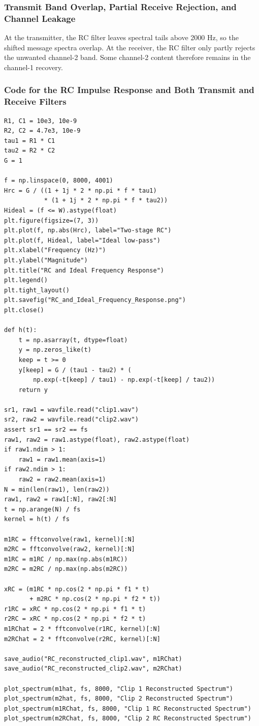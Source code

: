 \documentclass[11pt,a4paper]{article}
\begin{document}
\subsubsection{Transmit Band Overlap, Partial Receive Rejection, and Channel Leakage}

At the transmitter, the RC filter leaves spectral tails above 2000 Hz, so the shifted message spectra overlap. At the receiver, the RC filter only partly rejects the unwanted channel-2 band. Some channel-2 content therefore remains in the channel-1 recovery.

\subsubsection{Code for the RC Impulse Response and Both Transmit and Receive Filters}
\begin{lstlisting}
R1, C1 = 10e3, 10e-9
R2, C2 = 4.7e3, 10e-9
tau1 = R1 * C1
tau2 = R2 * C2
G = 1

f = np.linspace(0, 8000, 4001)
Hrc = G / ((1 + 1j * 2 * np.pi * f * tau1)
           * (1 + 1j * 2 * np.pi * f * tau2))
Hideal = (f <= W).astype(float)
plt.figure(figsize=(7, 3))
plt.plot(f, np.abs(Hrc), label="Two-stage RC")
plt.plot(f, Hideal, label="Ideal low-pass")
plt.xlabel("Frequency (Hz)")
plt.ylabel("Magnitude")
plt.title("RC and Ideal Frequency Response")
plt.legend()
plt.tight_layout()
plt.savefig("RC_and_Ideal_Frequency_Response.png")
plt.close()

def h(t):
    t = np.asarray(t, dtype=float)
    y = np.zeros_like(t)
    keep = t >= 0
    y[keep] = G / (tau1 - tau2) * (
        np.exp(-t[keep] / tau1) - np.exp(-t[keep] / tau2))
    return y

sr1, raw1 = wavfile.read("clip1.wav")
sr2, raw2 = wavfile.read("clip2.wav")
assert sr1 == sr2 == fs
raw1, raw2 = raw1.astype(float), raw2.astype(float)
if raw1.ndim > 1:
    raw1 = raw1.mean(axis=1)
if raw2.ndim > 1:
    raw2 = raw2.mean(axis=1)
N = min(len(raw1), len(raw2))
raw1, raw2 = raw1[:N], raw2[:N]
t = np.arange(N) / fs
kernel = h(t) / fs

m1RC = fftconvolve(raw1, kernel)[:N]
m2RC = fftconvolve(raw2, kernel)[:N]
m1RC = m1RC / np.max(np.abs(m1RC))
m2RC = m2RC / np.max(np.abs(m2RC))

xRC = (m1RC * np.cos(2 * np.pi * f1 * t)
       + m2RC * np.cos(2 * np.pi * f2 * t))
r1RC = xRC * np.cos(2 * np.pi * f1 * t)
r2RC = xRC * np.cos(2 * np.pi * f2 * t)
m1RChat = 2 * fftconvolve(r1RC, kernel)[:N]
m2RChat = 2 * fftconvolve(r2RC, kernel)[:N]

save_audio("RC_reconstructed_clip1.wav", m1RChat)
save_audio("RC_reconstructed_clip2.wav", m2RChat)

plot_spectrum(m1hat, fs, 8000, "Clip 1 Reconstructed Spectrum")
plot_spectrum(m2hat, fs, 8000, "Clip 2 Reconstructed Spectrum")
plot_spectrum(m1RChat, fs, 8000, "Clip 1 RC Reconstructed Spectrum")
plot_spectrum(m2RChat, fs, 8000, "Clip 2 RC Reconstructed Spectrum")
\end{lstlisting}
\end{document}
